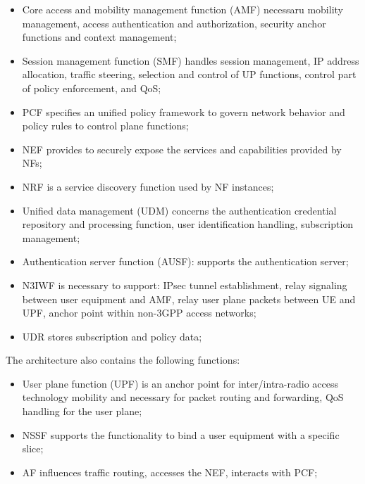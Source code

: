 \documentclass[a4paper,12pt]{report} %
\begin{document}
\begin{itemize}
\item Core access and mobility management function
(AMF) necessaru mobility management, access
authentication and authorization, security
anchor functions and context management;

\item Session management function (SMF) handles session
management, IP address allocation, traffic
steering, selection and control of UP functions,
control part of policy enforcement,
and QoS;

\item \gls{PCF} specifies an unified policy
framework to govern network behavior and policy
rules to control plane functions;

\item \gls{NEF} provides
to securely expose the services and
capabilities provided by NFs;

\item \gls{NRF} is a service discovery
function used by NF instances;

\item Unified data management (UDM) concerns the authentication
credential repository and processing
function, user identification handling, subscription
management;

\item Authentication server function (AUSF): supports
the authentication server;

\item \gls{N3IWF} is necessary to support:
IPsec tunnel establishment, relay signaling
between user equipment and AMF,
relay user plane packets between UE and UPF, anchor point within non-3GPP access networks;

\item \gls{UDR} stores subscription
and policy data;
\end{itemize}
The architecture also contains the following
functions:
\begin{itemize}
\item User plane function (UPF) is an anchor point for
inter/intra-radio access technology
mobility and necessary for packet routing and forwarding,
QoS handling for the user plane;

\item \gls{NSSF} supports
the functionality to bind a user equipment with a
specific slice;

\item \gls{AF} influences traffic
routing, accesses the NEF, interacts with PCF;
\end{itemize}
\end{document}
